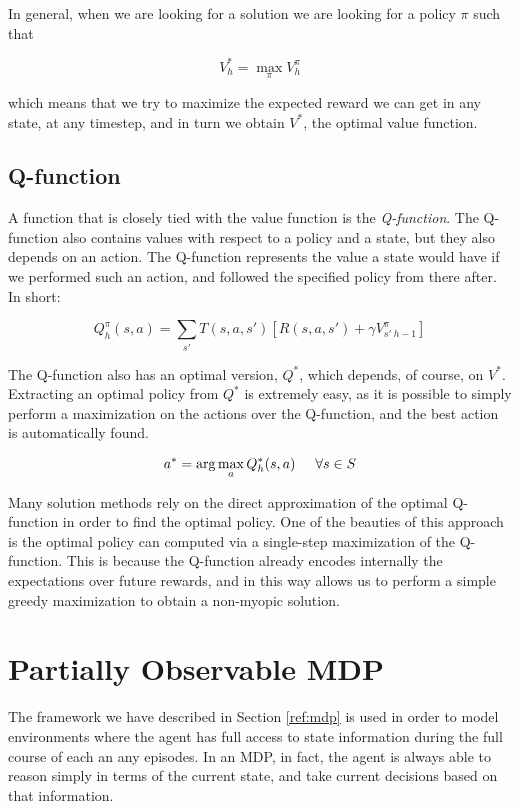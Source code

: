 In general, when we are looking for a solution we are looking for a policy $\pi$ such that

\[ V^{*}_h = \max_\pi V^{\pi}_h \]

which means that we try to maximize the expected reward we can get in any state, at any timestep,
and in turn we obtain $V^*$, the optimal value function.

\subsection{Q-function}

A function that is closely tied with the value function is the \textit{Q-function}. The Q-function
also contains values with respect to a policy and a state, but they also depends on an action. The
Q-function represents the value a state would have if we performed such an action, and followed the
specified policy from there after. In short:

\[ Q^{\pi}_{h}(s,a) = \sum_{s'} T(s, a, s') \left [ R(s, a, s') + \gamma
V^{\pi}_{s'\:h-1} \right ] \]

The Q-function also has an optimal version, $Q^*$, which depends, of course, on $V^*$. Extracting an
optimal policy from $Q^*$ is extremely easy, as it is possible to simply perform a maximization on
the actions over the Q-function, and the best action is automatically found.

\[ a^* = \arg\max_a Q^*_h(s,a) \hspace{.5cm}\forall s \in S\]

Many solution methods rely on the direct approximation of the optimal Q-function in order to find
the optimal policy. One of the beauties of this approach is the optimal policy can computed via a
single-step maximization of the Q-function. This is because the Q-function already encodes
internally the expectations over future rewards, and in this way allows us to perform a simple
greedy maximization to obtain a non-myopic solution.

\section{Partially Observable MDP}\label{ref:pomdp}

The framework we have described in Section \ref{ref:mdp} is used in order to model environments
where the agent has full access to state information during the full course of each an any episodes.
In an MDP, in fact, the agent is always able to reason simply in terms of the current state, and
take current decisions based on that information.

